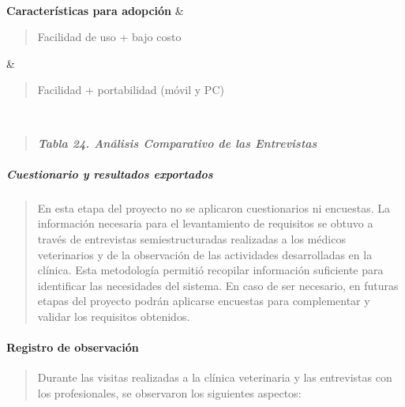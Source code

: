 \documentclass[
]{article}
\begin{document}
{\begin{longtable}[]
\begin{minipage}[t]{\linewidth}
\end{minipage} \\
\textbf{Características para adopción} &
\begin{minipage}[t]{\linewidth}\raggedright
\begin{quote}
Facilidad de uso + bajo costo
\end{quote}
\end{minipage} & \begin{minipage}[t]{\linewidth}\raggedright
\begin{quote}
Facilidad + portabilidad (móvil y PC)
\end{quote}
\end{minipage} \\
\end{longtable}
}

\begin{quote}
\protect{}\label{_bookmark84}{}\emph{\textbf{Tabla 24.
Análisis Comparativo de las Entrevistas}}
\end{quote}

\subparagraph{Cuestionario y resultados
exportados}\label{cuestionario-y-resultados-exportados}

\begin{quote}
En esta etapa del proyecto no se aplicaron cuestionarios ni encuestas.
La información necesaria para el levantamiento de requisitos se obtuvo a
través de entrevistas semiestructuradas realizadas a los médicos
veterinarios y de la observación de las actividades desarrolladas en la
clínica. Esta metodología permitió recopilar información suficiente para
identificar las necesidades del sistema. En caso de ser necesario, en
futuras etapas del proyecto podrán aplicarse encuestas para complementar
y validar los requisitos obtenidos.
\end{quote}

\paragraph{Registro de observación}\label{registro-de-observaciuxf3n}

\begin{quote}
Durante las visitas realizadas a la clínica veterinaria y las
entrevistas con los profesionales, se observaron los siguientes
aspectos:
\end{quote}
\end{document}
